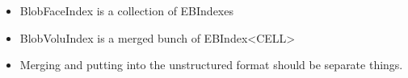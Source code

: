\begin{itemize}
\item BlobFaceIndex is a collection of EBIndexes
\item BlobVoluIndex is a merged bunch of EBIndex<CELL>
\item Merging and putting into the unstructured format should be
  separate things.      
\end{itemize}
  
